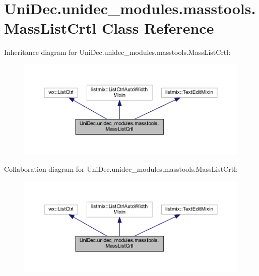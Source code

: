 \hypertarget{class_uni_dec_1_1unidec__modules_1_1masstools_1_1_mass_list_crtl}{}\section{Uni\+Dec.\+unidec\+\_\+modules.\+masstools.\+Mass\+List\+Crtl Class Reference}
\label{class_uni_dec_1_1unidec__modules_1_1masstools_1_1_mass_list_crtl}


Inheritance diagram for Uni\+Dec.\+unidec\+\_\+modules.\+masstools.\+Mass\+List\+Crtl\+:\nopagebreak
\begin{figure}[H]
\begin{center}
\leavevmode
\includegraphics[width=350pt]{class_uni_dec_1_1unidec__modules_1_1masstools_1_1_mass_list_crtl__inherit__graph}
\end{center}
\end{figure}


Collaboration diagram for Uni\+Dec.\+unidec\+\_\+modules.\+masstools.\+Mass\+List\+Crtl\+:\nopagebreak
\begin{figure}[H]
\begin{center}
\leavevmode
\includegraphics[width=350pt]{class_uni_dec_1_1unidec__modules_1_1masstools_1_1_mass_list_crtl__coll__graph}
\end{center}
\end{figure}
